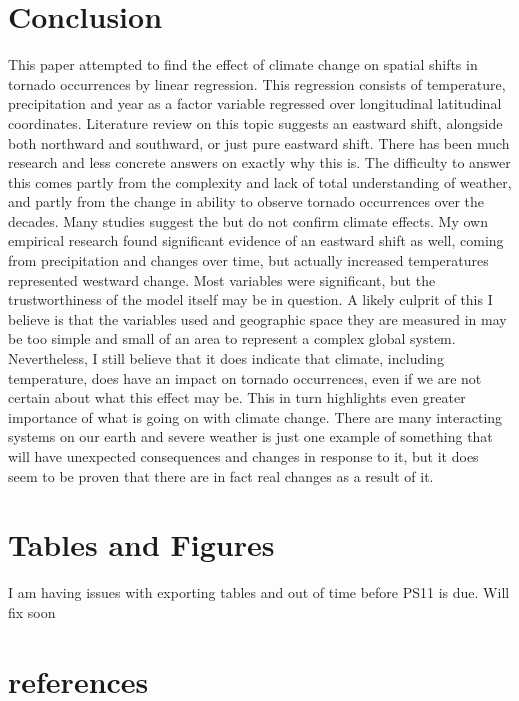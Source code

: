 \documentclass[12pt,english]{article}
\begin{document}
\section{Conclusion}\label{sec:conclusion}
\hspace{1cm} This paper attempted to find the effect of climate change on spatial shifts in tornado occurrences by linear regression. This regression consists of temperature, precipitation and year as a factor variable regressed over longitudinal latitudinal coordinates. Literature review on this topic suggests an eastward shift, alongside both northward and southward, or just pure eastward shift. There has been much research and less concrete answers on exactly why this is. The difficulty to answer this comes partly from the complexity and lack of total understanding of weather, and partly from the change in ability to observe tornado occurrences over the decades. Many studies suggest the but do not confirm climate effects. My own empirical research found significant evidence of an eastward shift as well, coming from precipitation and changes over time, but actually increased temperatures represented westward change. Most variables were significant, but the trustworthiness of the model itself may be in question. A likely culprit of this I believe is that the variables used and geographic space they are measured in may be too simple and small of an area to represent a complex global system. Nevertheless, I still believe that it does indicate that climate, including temperature, does have an impact on tornado occurrences, even if we are not certain about what this effect may be. This in turn highlights even greater importance of what is going on with climate change. There are many interacting systems on our earth and severe weather is just one example of something that will have unexpected consequences and changes in response to it, but it does seem to be proven that there are in fact real changes as a result of it.  

\section{Tables and Figures}


I am having issues with exporting tables and out of time before PS11 is due. Will fix soon

\section{references}
 

\end{document}
